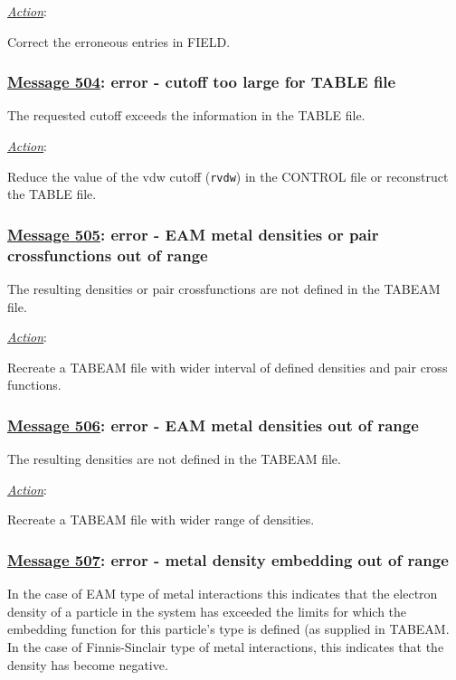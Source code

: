 \noindent \underline{\em Action}:

Correct the erroneous entries in FIELD.

\subsubsection*{\underline{Message 504}: error - cutoff too large for TABLE file}

The requested cutoff exceeds the information in the TABLE file.

\noindent \underline{\em Action}:

Reduce the value of the vdw cutoff ({\tt rvdw}) in the CONTROL
file or reconstruct the TABLE file.


\subsubsection*{\underline{Message 505}: error - EAM metal densities or pair crossfunctions out of range}

The resulting densities or pair crossfunctions are not defined in the TABEAM file.

\noindent \underline{\em Action}:

Recreate a TABEAM file with wider interval of defined densities and pair cross functions.

\subsubsection*{\underline{Message 506}: error - EAM metal densities out of range}

The resulting densities are not defined in the TABEAM file.

\noindent \underline{\em Action}:

Recreate a TABEAM file with wider range of densities.

\subsubsection*{\underline{Message 507}: error - metal density embedding out of range}

In the case of EAM type of metal interactions this indicates
that the electron density of a particle in the system has
exceeded the limits for which the embedding function for
this particle's type is defined (as supplied in TABEAM.  In
the case of Finnis-Sinclair type of metal interactions, this
indicates that the density has become negative.


